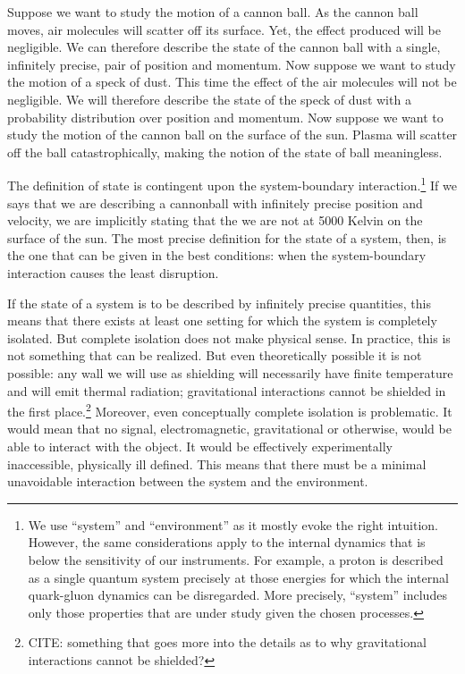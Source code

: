\documentclass[10pt,twocolumn, nofootinbib]{revtex4-2}
\begin{document}
Suppose we want to study the motion of a cannon ball. As the cannon ball moves, air molecules will scatter off its surface. Yet, the effect produced will be negligible. We can therefore describe the state of the cannon ball with a single, infinitely precise, pair of position and momentum. Now suppose we want to study the motion of a speck of dust. This time the effect of the air molecules will not be negligible. We will therefore describe the state of the speck of dust with a probability distribution over position and momentum. Now suppose we want to study the motion of the cannon ball on the surface of the sun. Plasma will scatter off the ball catastrophically, making the notion of the state of ball meaningless.

The definition of state is contingent upon the system-boundary interaction.\footnote{We use ``system'' and ``environment'' as it mostly evoke the right intuition. However, the same considerations apply to the internal dynamics that is below the sensitivity of our instruments. For example, a proton is described as a single quantum system precisely at those energies for which the internal quark-gluon dynamics can be disregarded. More precisely, ``system'' includes only those properties that are under study given the chosen processes.} If we says that we are describing a cannonball with infinitely precise position and velocity, we are implicitly stating that the we are not at 5000 Kelvin on the surface of the sun. The most precise definition for the state of a system, then, is the one that can be given in the best conditions: when the system-boundary interaction causes the least disruption.

If the state of a system is to be described by infinitely precise quantities, this means that there exists at least one setting for which the system is completely isolated. But complete isolation does not make physical sense. In practice, this is not something that can be realized. But even theoretically possible it is not possible: any wall we will use as shielding will necessarily have finite temperature and will emit thermal radiation; gravitational interactions cannot be shielded in the first place.\footnote{CITE: something that goes more into the details as to why gravitational interactions cannot be shielded?} Moreover, even conceptually complete isolation is problematic. It would mean that no signal, electromagnetic, gravitational or otherwise, would be able to interact with the object. It would be effectively experimentally inaccessible, physically ill defined. This means that there must be a minimal unavoidable interaction between the system and the environment.
\end{document}
